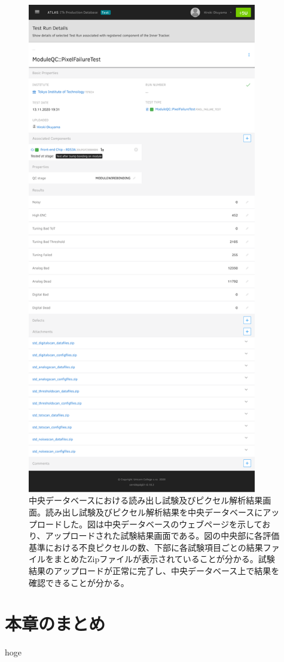 \begin{figure}[bpt]\centering
\includegraphics[width=10cm]{./pixel_test_result.pdf}
\caption[中央データベースにおける読み出し試験及びピクセル解析結果画面]{中央データベースにおける読み出し試験及びピクセル解析結果画面。読み出し試験及びピクセル解析結果を中央データベースにアップロードした。図は中央データベースのウェブページを示しており、アップロードされた試験結果画面である。図の中央部に各評価基準における不良ピクセルの数、下部に各試験項目ごとの結果ファイルをまとめたZipファイルが表示されていることが分かる。試験結果のアップロードが正常に完了し、中央データベース上で結果を確認できることが分かる。}
\label{demo_upload_to_pd}
\end{figure}

\section{本章のまとめ}
hoge
